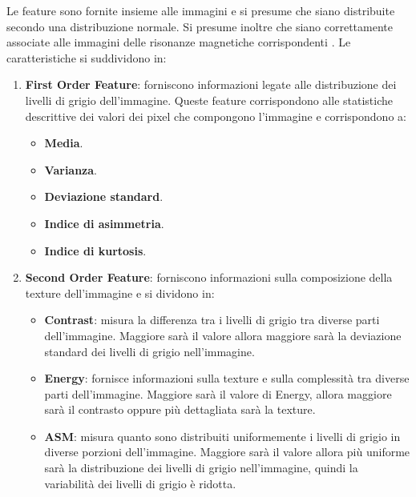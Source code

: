 Le feature sono fornite insieme alle immagini e si presume che siano distribuite
secondo una distribuzione normale. Si presume inoltre che siano correttamente
associate alle immagini delle risonanze magnetiche corrispondenti \cite{explanation-features}.
Le caratteristiche si suddividono in:
\begin{enumerate}
      \item \textbf{First Order Feature}: forniscono informazioni legate alle
            distribuzione dei livelli di grigio dell'immagine. Queste feature
            corrispondono alle statistiche descrittive dei valori dei pixel
            che compongono l'immagine e corrispondono a:
            \begin{itemize}
                  \item \textbf{Media}.
                  \item \textbf{Varianza}.
                  \item \textbf{Deviazione standard}.
                  \item \textbf{Indice di asimmetria}.
                  \item \textbf{Indice di kurtosis}.
            \end{itemize}
      \item \textbf{Second Order Feature}: forniscono informazioni sulla
            composizione della texture dell'immagine e si dividono in:
            \begin{itemize}
                  \item \textbf{Contrast}: misura la differenza tra i livelli di
                        grigio tra diverse parti dell'immagine. Maggiore sarà il
                        valore allora maggiore sarà la deviazione standard dei
                        livelli di grigio nell'immagine.
                  \item \textbf{Energy}: fornisce informazioni sulla texture e
                        sulla complessità tra diverse parti dell'immagine. Maggiore sarà il valore di Energy,
                        allora maggiore sarà il contrasto oppure più dettagliata
                        sarà la texture.
                  \item \textbf{ASM}: misura quanto sono distribuiti uniformemente
                        i livelli di grigio in diverse porzioni dell'immagine. Maggiore sarà il valore
                        allora più uniforme sarà la distribuzione dei livelli di
                        grigio nell'immagine, quindi la variabilità dei livelli
                        di grigio è ridotta.

\end{itemize}
\end{enumerate}
